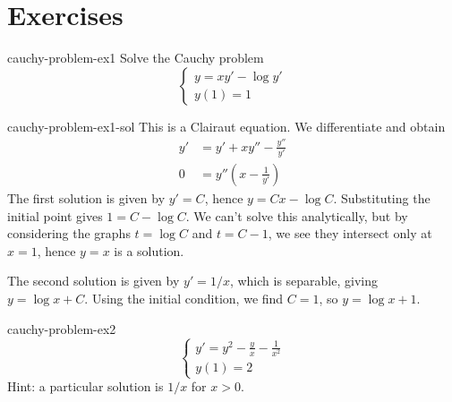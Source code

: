 \documentclass[preview]{standalone}
\begin{document}
\genpage

\section{Exercises}

\begin{snippetexercise}{cauchy-problem-ex1}{}
    Solve the Cauchy problem
    \[
        \begin{cases}
            y = xy' - \log y' \\
            y(1) = 1
        \end{cases}
    \]
\end{snippetexercise}

\begin{snippetsolution}{cauchy-problem-ex1-sol}{}
    This is a Clairaut equation. We differentiate and obtain
    \begin{align*}
        y' &= y' + xy'' - \frac{y''}{y'} \\
        0 &= y''\left(x - \frac{1}{y'}\right)
    \end{align*}
    The first solution is given by \(y' = C\), hence \(y = Cx - \log C\).
    Substituting the initial point gives \(1 = C - \log C\). We can't solve this analytically,
    but by considering the graphs \(t = \log C\) and \(t = C - 1\), we see they intersect only at \(x = 1\),
    hence \(y = x\) is a solution.

    The second solution is given by \(y' = 1/x\), which is separable, giving \(y = \log x + C\).
    Using the initial condition, we find \(C = 1\), so \(y = \log x + 1\).
\end{snippetsolution}

\begin{snippetexercise}{cauchy-problem-ex2}{}
    \[
        \begin{cases}
            y' = y^2 - \frac{y}{x} - \frac{1}{x^2}     \\
            y(1) = 2
        \end{cases}
    \]
    Hint: a particular solution is \(1/x\) for \(x > 0\).
\end{snippetexercise}
\end{document}
